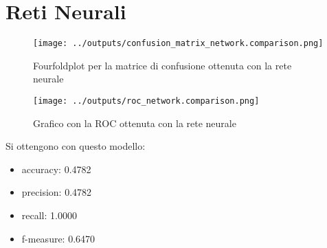 \section{Reti Neurali}
\begin{figure}[H]
    \centering
    \texttt{[image: ../outputs/confusion\_matrix\_network.comparison.png]}
    \caption{Fourfoldplot per la matrice di confusione ottenuta con la rete neurale}
\end{figure}
\begin{figure}[H]
    \centering
    \texttt{[image: ../outputs/roc\_network.comparison.png]}
    \caption{Grafico con la ROC ottenuta con la rete neurale}
\end{figure}
Si ottengono con questo modello:
\begin{itemize}
    \item accuracy: 0.4782
    \item precision: 0.4782
    \item recall: 1.0000
    \item f-measure: 0.6470
\end{itemize}
